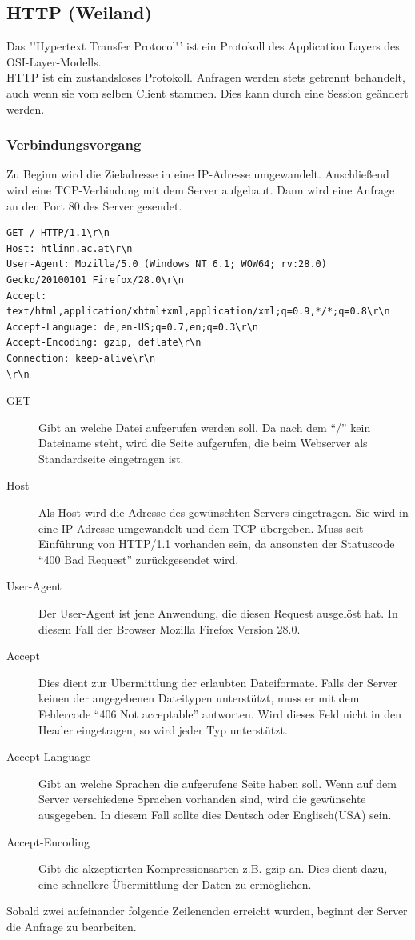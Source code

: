 \subsection{HTTP (Weiland)}

Das "'Hypertext Transfer Protocol"' ist ein Protokoll des Application Layers des OSI-Layer-Modells.
\\
HTTP ist ein zustandsloses Protokoll. Anfragen werden stets getrennt behandelt, auch wenn sie vom selben Client stammen. Dies kann durch eine Session geändert werden.
\subsubsection{Verbindungsvorgang}
Zu Beginn wird die Zieladresse in eine IP-Adresse umgewandelt.
Anschließend wird eine TCP-Verbindung  mit dem Server aufgebaut. 
Dann wird eine Anfrage an den Port 80 des Server gesendet.
\\
\begin{lstlisting}[style=custom, caption={HTTP-Request},label={lst:content_http_request}]
GET / HTTP/1.1\r\n
Host: htlinn.ac.at\r\n
User-Agent: Mozilla/5.0 (Windows NT 6.1; WOW64; rv:28.0) Gecko/20100101 Firefox/28.0\r\n
Accept: text/html,application/xhtml+xml,application/xml;q=0.9,*/*;q=0.8\r\n
Accept-Language: de,en-US;q=0.7,en;q=0.3\r\n
Accept-Encoding: gzip, deflate\r\n
Connection: keep-alive\r\n
\r\n
\end{lstlisting}

\begin{description}
\item[GET] Gibt an welche Datei aufgerufen werden soll. Da nach dem \enquote{/} kein Dateiname steht, wird die Seite aufgerufen, die beim Webserver als Standardseite eingetragen ist.
\item[Host] Als Host wird die Adresse des gewünschten Servers eingetragen. Sie wird in eine IP-Adresse umgewandelt und dem TCP übergeben. Muss seit Einführung von HTTP/1.1 vorhanden sein, da ansonsten der Statuscode \enquote{400 Bad Request} zurückgesendet wird.
\item[User-Agent] Der User-Agent ist jene Anwendung, die diesen Request ausgelöst hat. In diesem Fall der Browser Mozilla Firefox Version 28.0.
\item[Accept] Dies dient zur Übermittlung der erlaubten Dateiformate. Falls der Server keinen der angegebenen Dateitypen unterstützt, muss er mit dem Fehlercode \enquote{406 Not acceptable} antworten. Wird dieses Feld nicht in den Header eingetragen, so wird jeder Typ unterstützt.
\item[Accept-Language] Gibt an welche Sprachen die aufgerufene Seite haben soll. Wenn auf dem Server verschiedene Sprachen vorhanden sind, wird die gewünschte ausgegeben. In diesem Fall sollte dies Deutsch oder Englisch(USA) sein. 
\item[Accept-Encoding] Gibt die akzeptierten Kompressionsarten z.B. gzip an. Dies dient dazu, eine schnellere Übermittlung der Daten zu ermöglichen.
\end{description} 
Sobald zwei aufeinander folgende Zeilenenden erreicht wurden, beginnt der Server die Anfrage zu bearbeiten.

